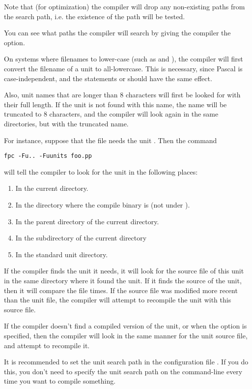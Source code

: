 Note that (for optimization) the compiler will drop any non-existing paths 
from the search path, i.e. the existence of the path will be tested.

You can see what paths the compiler will search by giving the compiler
the  option.

On systems where filenames to lower-case (such as \unix and \linux), the compiler 
will first convert the filename of a unit to all-lowercase. This is necessary, 
since Pascal is case-independent, and the statements  or 
 should have the same effect.

Also, unit names that are longer than 8 characters will first be looked for
with their full length. If the unit is not found with this name, the name
will be truncated to 8 characters, and the compiler will look again in the
same directories, but with the truncated name.

For instance, suppose that the file  needs the unit
. Then the command
\begin{verbatim}
fpc -Fu.. -Fuunits foo.pp
\end{verbatim}
will tell the compiler to look for the unit  in the following
places:
\begin{enumerate}
\item In the current directory.
\item In the directory where the compile binary is (not under \linux).
\item In the parent directory of the current directory.
\item In the subdirectory  of the current directory
\item In the standard unit directory.
\end{enumerate}

If the compiler finds the unit it needs, it will look for the source file of
this unit in the same directory where it found the unit.
If it finds the source of the unit, then it will compare the file times.
If the source file was modified more recent than the unit file, the
compiler will attempt to recompile the unit with this source file.

If the compiler doesn't find a compiled version of the unit, or when the
 option is specified, then the compiler will look in the same
manner for the unit source file, and attempt to recompile it.

It is recommended to set the unit search path in the configuration file
. If you do this, you don't need to specify the unit search
path on the command-line every time you want to compile something.

